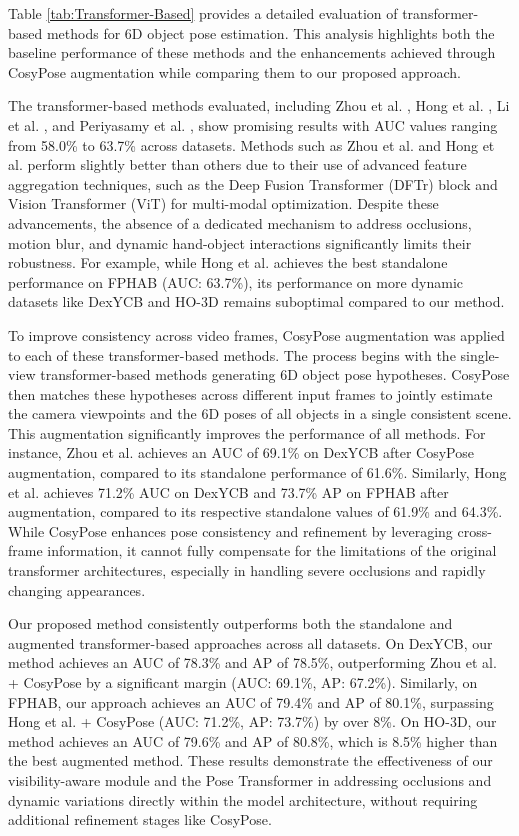 
Table \ref{tab:Transformer-Based} provides a detailed evaluation of transformer-based methods for 6D object pose estimation. This analysis highlights both the baseline performance of these methods and the enhancements achieved through CosyPose \cite{labbe2020cosypose} augmentation while comparing them to our proposed approach.

The transformer-based methods evaluated, including Zhou et al. \cite{zhou2023deep}, Hong et al. \cite{hong2024transformer}, Li et al. \cite{li2023depth}, and Periyasamy et al. \cite{periyasamy2023yolopose}, show promising results with AUC values ranging from 58.0\% to 63.7\% across datasets. Methods such as Zhou et al. and Hong et al. perform slightly better than others due to their use of advanced feature aggregation techniques, such as the Deep Fusion Transformer (DFTr) block and Vision Transformer (ViT) for multi-modal optimization. Despite these advancements, the absence of a dedicated mechanism to address occlusions, motion blur, and dynamic hand-object interactions significantly limits their robustness. For example, while Hong et al. achieves the best standalone performance on FPHAB (AUC: 63.7\%), its performance on more dynamic datasets like DexYCB and HO-3D remains suboptimal compared to our method.

To improve consistency across video frames, CosyPose augmentation \cite{labbe2020cosypose} was applied to each of these transformer-based methods. The process begins with the single-view transformer-based methods generating 6D object pose hypotheses. CosyPose then matches these hypotheses across different input frames to jointly estimate the camera viewpoints and the 6D poses of all objects in a single consistent scene. This augmentation significantly improves the performance of all methods. For instance, Zhou et al. \cite{zhou2023deep} achieves an AUC of 69.1\% on DexYCB after CosyPose augmentation, compared to its standalone performance of 61.6\%. Similarly, Hong et al. achieves 71.2\% AUC on DexYCB and 73.7\% AP on FPHAB after augmentation, compared to its respective standalone values of 61.9\% and 64.3\%. While CosyPose enhances pose consistency and refinement by leveraging cross-frame information, it cannot fully compensate for the limitations of the original transformer architectures, especially in handling severe occlusions and rapidly changing appearances.

Our proposed method consistently outperforms both the standalone and augmented transformer-based approaches across all datasets. On DexYCB, our method achieves an AUC of 78.3\% and AP of 78.5\%, outperforming Zhou et al. + CosyPose by a significant margin (AUC: 69.1\%, AP: 67.2\%). Similarly, on FPHAB, our approach achieves an AUC of 79.4\% and AP of 80.1\%, surpassing Hong et al. + CosyPose (AUC: 71.2\%, AP: 73.7\%) by over 8\%. On HO-3D, our method achieves an AUC of 79.6\% and AP of 80.8\%, which is 8.5\% higher than the best augmented method. These results demonstrate the effectiveness of our visibility-aware module and the Pose Transformer in addressing occlusions and dynamic variations directly within the model architecture, without requiring additional refinement stages like CosyPose.


